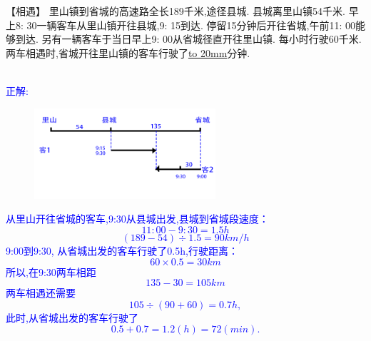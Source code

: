 \item {
    【相遇】
    里山镇到省城的高速路全长189千米,途径县城. 县城离里山镇54千米. 早上8: 30一辆客车从里山镇开往县城,9: 15到达. 停留15分钟后开往省城,午前11: 00能够到达. 另有一辆客车于当日早上9: 00从省城径直开往里山镇. 每小时行驶60千米. 两车相遇时,省城开往里山镇的客车行驶了\underline{\hbox to 20mm{}}分钟.
    \ifshowSolution 
        \fangsong{}\textcolor{blue}{
            \\正解: \\
            \begin{figure}[H] 
                \centering
                \includegraphics[width=0.6\textwidth]{./pics/Chapter_3/seikai_1.png}
            \end{figure}
                从里山开往省城的客车,9:30从县城出发,县城到省城段速度：
                    \[11:00 - 9:30 = 1.5 h\]
                    \[(189-54)\div 1.5=90 km/h\]
                9:00到9:30, 从省城出发的客车行驶了0.5h,行驶距离：
                    \[60\times 0.5 = 30km\]
                所以,在9:30两车相距
                    \[135 - 30 = 105 km\]
                两车相遇还需要
                \[105\div (90+60) = 0.7h,\]
                此时,从省城出发的客车行驶了
                \[0.5 + 0.7 = 1.2(h) = 72(min).\]
        }
    \else
        \vspace{2cm}
    \fi
}


